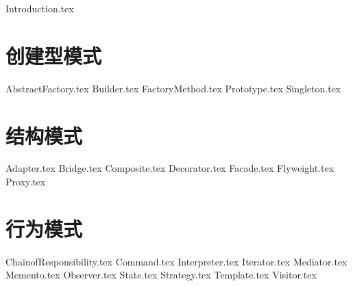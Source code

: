 \documentclass{PionpillNote-book}
\begin{document}
\date{\today}
\tableofcontents
\newpage

\setcounter{page}{1} 
\pagestyle{fancy}

{Introduction.tex}
\section{创建型模式}
{AbstractFactory.tex}
{Builder.tex}
{FactoryMethod.tex}
{Prototype.tex}
{Singleton.tex}

\section{结构模式}
{Adapter.tex}
{Bridge.tex}
{Composite.tex}
{Decorator.tex}
{Facade.tex}
{Flyweight.tex}
{Proxy.tex}

\section{行为模式}
{ChainofResponsibility.tex}
{Command.tex}
{Interpreter.tex}
{Iterator.tex}
{Mediator.tex}
{Memento.tex}
{Observer.tex}
{State.tex}
{Strategy.tex}
{Template.tex}
{Visitor.tex}
\end{document}
